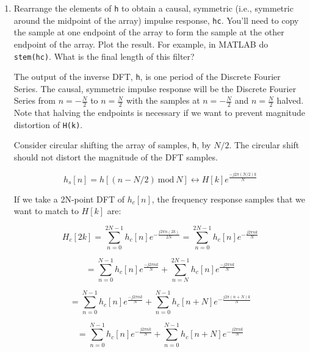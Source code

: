 \documentclass[fleqn]{article}
\begin{document}
\begin{enumerate}
\begin{enumerate}[nolistsep]
			\item Rearrange the elements of \texttt{h} to obtain a causal, symmetric (i.e., symmetric around the midpoint of the array) impulse response, \texttt{hc}. You'll need to copy the sample at one endpoint of the array to form the sample at the other endpoint of the array. Plot the result. For example, in MATLAB do \texttt{stem(hc)}. What is the final length of this filter?
			
			The output of the inverse DFT, \texttt{h}, is one period of the Discrete Fourier Series. The causal, symmetric impulse response will be the Discrete Fourier Series from $n=-\frac{N}{2}$ to $n=\frac{N}{2}$ with the samples at $n=-\frac{N}{2}$ and $n=\frac{N}{2}$ halved. Note that halving the endpoints is necessary if we want to prevent magnitude distortion of \texttt{H(k)}.
			 
			\pagebreak
			Consider circular shifting the array of samples, \texttt{h}, by $N/2$. The circular shift should not distort the magnitude of the DFT samples.
			
			\begin{equation*}
				h_s[n] = h[(n - N/2)\ \text{mod}\ N] \leftrightarrow H[k]e^{\frac{-j{2\pi}(N/2)k}{N}}
			\end{equation*}
			
			If we take a 2N-point DFT of $h_c[n]$, the frequency response samples that we want to match to $H[k]$ are:
			 
			\begin{equation*}
				H_c[2k] = \sum_{n=0}^{2N-1}{h_c[n]e^{-\frac{j2{\pi}n(2k)}{2N}}} = \sum_{n=0}^{2N-1}{h_c[n]e^{-\frac{j2{\pi}nk}{N}}}
			\end{equation*}
			
			\begin{equation*}
				= \sum_{n=0}^{N-1}{h_c[n]e^{\frac{-j2{\pi}nk}{N}}} + \sum_{n=N}^{2N-1}{h_c[n]e^{\frac{-j2{\pi}nk}{N}}}
			\end{equation*}
			
			\begin{equation*}
				 = \sum_{n=0}^{N-1}{h_c[n]e^{\frac{-j2{\pi}nk}{N}}} + \sum_{n=0}^{N-1}{h_c[n+N]e^{-\frac{j2{\pi}(n+N)k}{N}}}
			\end{equation*}
			
			\begin{equation*}
				 = \sum_{n=0}^{N-1}{h_c[n]e^{-\frac{j2{\pi}nk}{N}}} + \sum_{n=0}^{N-1}{h_c[n+N]e^{-\frac{j2{\pi}nk}{N}}}
			\end{equation*}
			

\end{enumerate}
\end{enumerate}
\end{document}
